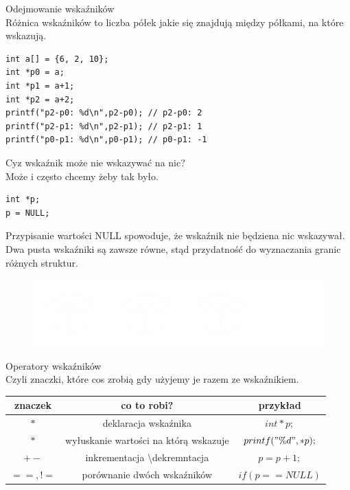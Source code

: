 \documentclass[notheorems, aspectratio=54]{beamer}
\begin{document}
\begin{frame}[fragile]
Odejmowanie wskaźników\\

Różnica wskaźników to liczba półek jakie się znajdują między półkami, na które wskazują.

\begin{lstlisting}
int a[] = {6, 2, 10};
int *p0 = a;
int *p1 = a+1;
int *p2 = a+2;
printf("p2-p0: %d\n",p2-p0); // p2-p0: 2
printf("p2-p1: %d\n",p2-p1); // p2-p1: 1
printf("p0-p1: %d\n",p0-p1); // p0-p1: -1
\end{lstlisting}

\end{frame}

\begin{frame}[fragile]
Cyz wskaźnik może nie wskazywać na nic?\\
Może i często chcemy żeby tak było.
\begin{lstlisting}
int *p;
p = NULL;
\end{lstlisting}

Przypisanie wartości NULL spowoduje, że wskaźnik nie będziena nic wskazywał.\\
Dwa pusta wskaźniki są zawsze równe, stąd przydatność do wyznaczania granic różnych struktur.
\begin{figure}

  \includegraphics[width=0.9\linewidth]{lista}
\end{figure}

\end{frame}

\begin{frame}[fragile]
Operatory wskaźników\\
Czyli znaczki, które cos zrobią gdy użyjemy je razem ze wskaźnikiem.\\
\center
\begin{tabular}{ |c |c | c |}
\hline
 znaczek & co to robi? & przykład \\ 
\hline
 $*$ & deklaracja wskaźnika & $int *p;$ \\ 
\hline
 $*$ & wyłuskanie wartości na którą wskazuje & $printf(" \% d", *p);$ \\ 
\hline

$+-$ & inkrementacja \textbackslash dekremntacja & $p = p + 1;$ \\ 
\hline
 $==, !=$ & porównanie dwóch wskaźników & $if(p == NULL)$ \\ 
\hline

\end{tabular}


\end{frame}
\end{document}

